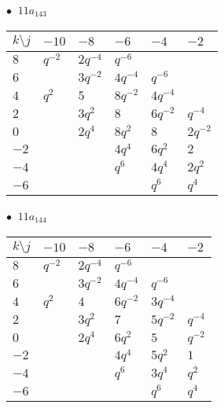 \begin{minipage}{\linewidth}
$\bullet\ $ $11a_{143}$ \vspace{0.5em} \\
\begin{tabular}{l|lllll}
$k \setminus j$ & $-10$ & $-8$ & $-6$ & $-4$ & $-2$ \\
\hline
$8$ & $q^{-2}$ & $2q^{-4}$ & $q^{-6}$ &  &  \\
$6$ &  & $3q^{-2}$ & $4q^{-4}$ & $q^{-6}$ &  \\
$4$ & $q^{2}$ & $5$ & $8q^{-2}$ & $4q^{-4}$ &  \\
$2$ &  & $3q^{2}$ & $8$ & $6q^{-2}$ & $q^{-4}$ \\
$0$ &  & $2q^{4}$ & $8q^{2}$ & $8$ & $2q^{-2}$ \\
$-2$ &  &  & $4q^{4}$ & $6q^{2}$ & $2$ \\
$-4$ &  &  & $q^{6}$ & $4q^{4}$ & $2q^{2}$ \\
$-6$ &  &  &  & $q^{6}$ & $q^{4}$ \\
\end{tabular}
\vspace{2em}
\end{minipage}
%
\begin{minipage}{\linewidth}
$\bullet\ $ $11a_{144}$ \vspace{0.5em} \\
\begin{tabular}{l|lllll}
$k \setminus j$ & $-10$ & $-8$ & $-6$ & $-4$ & $-2$ \\
\hline
$8$ & $q^{-2}$ & $2q^{-4}$ & $q^{-6}$ &  &  \\
$6$ &  & $3q^{-2}$ & $4q^{-4}$ & $q^{-6}$ &  \\
$4$ & $q^{2}$ & $4$ & $6q^{-2}$ & $3q^{-4}$ &  \\
$2$ &  & $3q^{2}$ & $7$ & $5q^{-2}$ & $q^{-4}$ \\
$0$ &  & $2q^{4}$ & $6q^{2}$ & $5$ & $q^{-2}$ \\
$-2$ &  &  & $4q^{4}$ & $5q^{2}$ & $1$ \\
$-4$ &  &  & $q^{6}$ & $3q^{4}$ & $q^{2}$ \\
$-6$ &  &  &  & $q^{6}$ & $q^{4}$ \\
\end{tabular}
\vspace{2em}
\end{minipage}
%
